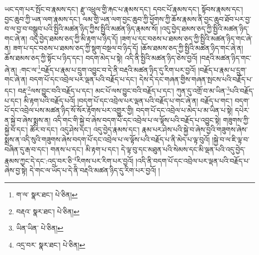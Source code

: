 ཡང་དག་པར་སྤོང་བ་རྣམས་དང་། རྫུ་འཕྲུལ་གྱི་རྐང་པ་རྣམས་དང་། དབང་པོ་རྣམས་དང་། སྟོབས་རྣམས་དང་། བྱང་ཆུབ་ཀྱི་ཡན་ལག་རྣམས་དང་། ལམ་གྱི་ཡན་ལག་བྱང་ཆུབ་ཀྱི་ཕྱོགས་ཀྱི་ཆོས་རྣམས་ནི་བྱང་ཆུབ་ཐོབ་པར་བྱ་བ་ལ་བྱ་བ་བསྒྲུབ་པའི་སྤྱིའི་མཚན་ཉིད་ཀྱིས་སྤྱིའི་མཚན་ཉིད་རྣམས་སོ། །འདུ་བྱེད་ཐམས་ཅད་ཀྱི་སྤྱིའི་མཚན་ཉིད་གང་ཞེ་ན། འདུ་བྱེད་ཐམས་ཅད་ཀྱི་མི་རྟག་པ་ཉིད་དོ། །ཟག་པ་དང་བཅས་པ་ཐམས་ཅད་ཀྱི་སྤྱིའི་མཚན་ཉིད་གང་ཞེ་ན། ཟག་པ་དང་བཅས་པ་ཐམས་ཅད་ཀྱི་སྡུག་བསྔལ་བ་ཉིད་དོ། །ཆོས་ཐམས་ཅད་ཀྱི་སྤྱིའི་མཚན་ཉིད་གང་ཞེ་ན། ཆོས་ཐམས་ཅད་ཀྱི་སྟོང་པ་ཉིད་དང་། བདག་མེད་པ་སྟེ། འདི་ནི་སྤྱིའི་མཚན་ཉིད་ཅེས་བྱའོ། །བརྡའི་མཚན་ཉིད་གང་ཞེ་ན། :གང་ལ་\footnote{ག་ལ་  སྣར་ཐང་།  པེ་ཅིན། }བརྗོད་པ་རྣམ་པ་དྲུག་འབྱུང་བ་དེ་ནི་བརྡའི་མཚན་ཉིད་དུ་རིག་པར་བྱའོ། །བརྗོད་པ་རྣམ་པ་དྲུག་གང་ཞེ་ན། བདག་པོ་དང་འབྲེལ་པར་ལྡན་པའི་བརྗོད་པ་དང་། དེས་དེ་དང་གཞན་གྱིས་གཞན་སྤངས་པའི་བརྗོད་པ་དང་། བརྡ་\footnote{བརྡའ་  སྣར་ཐང་།  པེ་ཅིན། }ལས་བྱུང་བའི་བརྗོད་པ་དང་། མང་པོ་ལས་བྱུང་བའི་བརྗོད་པ་དང་། ཀུན་དུ་འགྲོ་བ་མ་ཡིན་\footnote{ཡིན་ཡིན་  པེ་ཅིན། }པའི་བརྗོད་པ་དང་། མི་རྟག་པའི་བརྗོད་པའོ། །བདག་པོ་དང་འབྲེལ་པར་ལྡན་པའི་བརྗོད་པ་གང་ཞེ་ན། བརྗོད་པ་གང་། བདག་པོ་དང་འབྲེལ་པས་མཚན་ཉིད་སོ་སོར་རྟོགས་པར་འགྱུར་གྱི། བདག་པོ་དང་འབྲེལ་པ་མེད་པ་མ་ཡིན་པ་སྟེ། དཔེར་ན་སྐྱེ་བ་ཞེས་སྨྲས་ན། འདི་གང་གི་སྐྱེ་བ་ཞེས་བདག་པོ་དང་འབྲེལ་པ་ལ་ལྟོས་པའི་བརྗོད་པ་འབྱུང་སྟེ། གཟུགས་ཀྱི་སྐྱེ་བ་དང་། ཚོར་བ་དང་། འདུ་ཤེས་དང་། འདུ་བྱེད་རྣམས་དང་། རྣམ་པར་ཤེས་པའི་སྐྱེ་བ་ཞེས་བྱའི་གཟུགས་ཞེས་སྨྲས་ན་འདི་སུའི་གཟུགས་ཞེས་བདག་པོ་དང་འབྲེལ་པ་ལ་ལྟོས་པའི་བརྗོད་པ་ནི་མེད་པ་ལྟ་བུའོ། །སྐྱེ་བ་ལ་ཇི་ལྟ་བ་བཞིན་དུ་རྒ་བ་དང་། གནས་པ་དང་། མི་རྟག་པ་དང་། དེ་ལྟ་བུ་དང་མཐུན་པའི་སེམས་དང་མི་ལྡན་པའི་འདུ་བྱེད་རྣམས་ཀྱང་དེ་དང་:འདྲ་བར་ཅི་\footnote{འདྲ་བར་  སྣར་ཐང་།  པེ་ཅིན། }རིགས་པར་རིག་པར་བྱའོ། །འདི་ནི་བདག་པོ་དང་འབྲེལ་པར་ལྡན་པའི་བརྗོད་པ་ཞེས་བྱ་སྟེ། དེ་གང་ལ་ཡོད་པ་དེ་ནི་བརྡའི་མཚན་ཉིད་དུ་རིག་པར་བྱའོ། །
